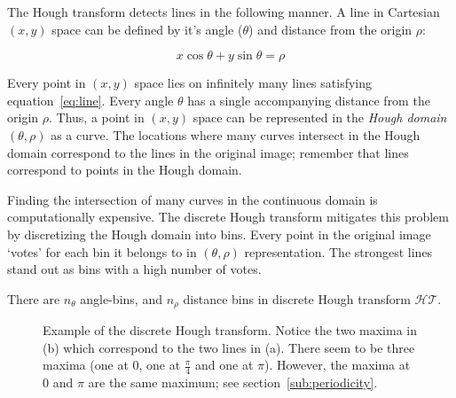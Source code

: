 The Hough transform detects lines in the following manner. A line in Cartesian $(x, y)$ space can be defined by it's angle ($\theta$) and distance from the origin $\rho$:

\begin{equation}
\label{eq:line}
x\cos \theta + y\sin \theta = \rho
\end{equation}

Every point in $(x,y)$ space lies on infinitely many lines satisfying equation~\ref{eq:line}. Every angle $\theta$ has a single accompanying distance from the origin $\rho$. Thus, a point in $(x,y)$ space can be represented in the \emph{Hough domain} $(\theta, \rho)$ as a curve. The locations where many curves intersect in the Hough domain correspond to the lines in the original image; remember that lines correspond to points in the Hough domain. 

Finding the intersection of many curves in the continuous domain is computationally expensive. The discrete Hough transform mitigates this problem by discretizing the Hough domain into bins. Every point in the original image `votes' for each bin it belongs to in $(\theta, \rho)$ representation. The strongest lines stand out as bins with a high number of votes.

There are $n_\theta$ angle-bins, and $n_\rho$ distance bins in discrete Hough transform $\mathcal{HT}$. 

\begin{figure}[ht]
\centering
{}
\caption{Example of the discrete Hough transform. Notice the two maxima in (b) which correspond to the two lines in (a). There seem to be three maxima (one at $0$, one at $\frac{\pi}{4}$ and one at $\pi$). However, the maxima at $0$ and $\pi$ are the same maximum; see section~\ref{sub:periodicity}.}
\label{fig:lines}
\end{figure}


